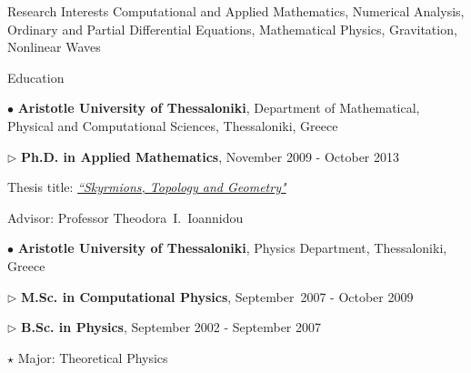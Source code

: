 \documentclass[10pt]{article} %
\newenvironment{outerlist}[1][\enskip\textbullet]%
        {\begin{itemize}[#1]}{\end{itemize}%
         \vspace{-.6\baselineskip}}
\newenvironment{innerlist}[1][\enskip\textbullet]%
        {\begin{compactitem}[#1]}{\end{compactitem}}
\begin{document}
\begin{section}{Research Interests}
\vskip -4.2mm
Computational and Applied Mathematics, Numerical Analysis,
Ordinary and Partial Differential Equations, Mathematical
Physics, Gravitation, Nonlinear Waves

\end{section}

\begin{section}{Education}
\vspace{-6.9mm} 
\begin{outerlist}
\item[$\bullet$] \textbf{Aristotle University of Thessaloniki}, Department of Mathematical, 
Physical and Computational Sciences, Thessaloniki, Greece
\begin{innerlist}
\item[$\triangleright$] \textbf{Ph.D. in Applied Mathematics}, November 2009 - October 2013
\item[] Thesis title: \href{http://phdtheses.ekt.gr/eadd/handle/10442/29355}{\emph{``Skyrmions, Topology and Geometry"}}
\item[] Advisor: Professor Theodora~I.~Ioannidou
\end{innerlist}
\item[$\bullet$] \textbf{Aristotle University of Thessaloniki}, Physics Department, Thessaloniki, Greece
\begin{innerlist}
\item[$\triangleright$] \textbf{M.Sc. in Computational Physics}, September~2007 - October 2009
\item[$\triangleright$] \textbf{B.Sc. in Physics}, September 2002 - September 2007
\begin{innerlist}
\item[$\star$] Major: Theoretical Physics
\end{innerlist}
\end{innerlist}
\end{outerlist}

\end{section}
\end{document}
